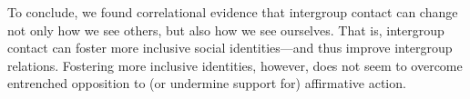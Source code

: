 \documentclass[12pt, a4paper]{article}
\begin{document}
To conclude, we found correlational evidence that intergroup contact can change not only how we see others, but also how we see ourselves. That is, intergroup contact can foster more inclusive social identities---and thus improve intergroup relations. Fostering more inclusive identities, however, does not seem to overcome entrenched opposition to (or undermine support for) affirmative action.

\nolinenumbers


\end{document}

